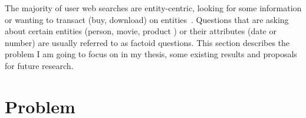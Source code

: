 %

\label{chapter:factoid}

\noindent

The majority of user web searches are entity-centric, \ie looking for some information or wanting to transact (\eg buy, download) on entities~\cite{pound2010ad}.
Questions that are asking about certain entities (\eg person, movie, product \etc) or their attributes (\eg date or number) are usually referred to as factoid questions.
This section describes the problem I am going to focus on in my thesis, some existing results and proposals for future research.

\section{Problem}
\label{section:factoid:problem}

